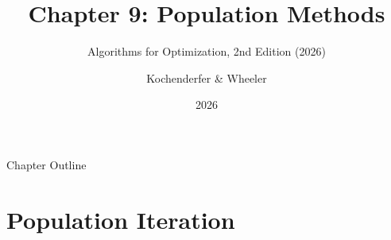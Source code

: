 \documentclass[aspectratio=169,10pt]{beamer}
\title[Ch.\ 9: Population Methods]{Chapter 9: Population Methods}
\subtitle{Algorithms for Optimization, 2nd Edition (2026)}
\author{Kochenderfer \& Wheeler}
\institute{Adapted for Lecture Slides}
\date{2026}
\begin{document}

\begin{frame}
  \titlepage
\end{frame}

\begin{frame}{Chapter Outline}
  \tableofcontents
\end{frame}

\section{Population Iteration}
\end{document}
